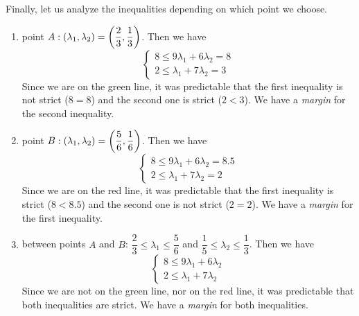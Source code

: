 Finally, let us analyze the inequalities depending on which point we choose. 
\begin{enumerate}
    \item point $A: \left( \lambda_{1},\lambda_{2} \right) = \left( \dfrac{2}{3},\dfrac{1}{3} \right)$.
    Then we have
    \begin{equation*}
    \begin{cases}
    8 \leq 9 \lambda_{1} + 6 \lambda_{2} = 8  \\
    2 \leq \lambda_{1} + 7 \lambda_{2} = 3
    \end{cases}
    \end{equation*}
    Since we are on the green line, it was predictable that the first inequality is not strict ($8 = 8$) and the second one is strict ($2 < 3$). We have a \textit{margin} for the second inequality.
    
    \item point $B: \left( \lambda_{1},\lambda_{2} \right) = \left( \dfrac{5}{6},\dfrac{1}{6} \right)$.
    Then we have
    \begin{equation*}
    \begin{cases}
    8 \leq 9 \lambda_{1} + 6 \lambda_{2} = 8.5  \\
    2 \leq \lambda_{1} + 7 \lambda_{2} = 2
    \end{cases}
    \end{equation*}
    Since we are on the red line, it was predictable that the first inequality is strict ($8 < 8.5$) and the second one is not strict ($2 = 2$). We have a \textit{margin} for the first inequality.
    
    \item between points $A$ and $B$: $\dfrac{2}{3} \leq \lambda_{1} \leq \dfrac{5}{6}$ and $\dfrac{1}{5} \leq \lambda_{2} \leq \dfrac{1}{3}$.
    Then we have
    \begin{equation*}
    \begin{cases}
    8 \leq 9 \lambda_{1} + 6 \lambda_{2}  \\
    2 \leq \lambda_{1} + 7 \lambda_{2}
    \end{cases}
    \end{equation*}
    Since we are not on the green line, nor on the red line, it was predictable that both inequalities are strict. We have a \textit{margin} for both inequalities.
    
    
\end{enumerate}
    
    
    
    
    




        